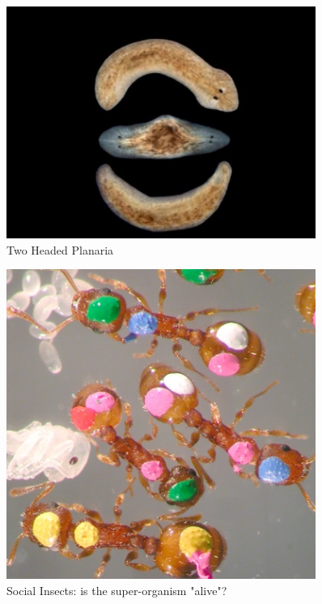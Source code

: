 \documentclass[]{article}
\begin{document}
\begin{figure}[H]
	\caption{Two Headed Planaria}\label{fig:2headed:planaria}
	\includegraphics[width=0.9\textwidth]{TwoHeadedPlanaria}
\end{figure}

\begin{figure}[H]
	\caption{Social Insects: is the super-organism "alive"?}\label{fig:social:insects}
	\includegraphics[width=0.9\textwidth]{SocialInsects}
\end{figure}
\end{document}
